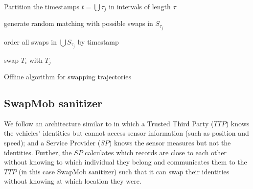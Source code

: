 \begin{algorithm}[t]
\SetAlgoNoLine
{}

Partition the timestamps $t =\bigcup \tau_j$ in intervals of length $\tau$

generate random matching with possible swaps in $S_{\tau_j}$\

order all swaps in $\bigcup S_{\tau_j}$ by timestamp\

{swap $T_i$ with $T_j$}

\caption{Offline algorithm for swapping trajectories}
\label{alg:one}
\end{algorithm}


\subsection{SwapMob sanitizer}

We follow an architecture similar to \cite{Hoh06} in which a Trusted Third Party ($TTP$) knows the
vehicles' identities but cannot access sensor information (such as position and  speed); and a Service Provider ($SP$) knows the sensor measures but not the identities.
Further, the $SP$ calculates which records are close to each other without knowing to which individual they belong and communicates them to the $TTP$ (in this case SwapMob sanitizer) such that it can swap their identities without knowing at which location they were.

